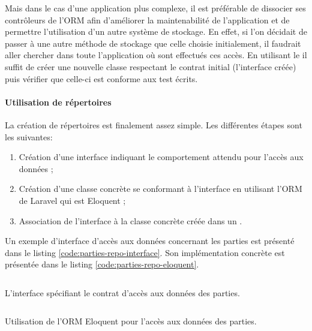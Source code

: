 				Mais dans le cas d'une application plus complexe, il est préférable de dissocier ses contrôleurs de l'ORM afin d'améliorer la maintenabilité de l'application et de permettre l'utilisation d'un autre système de stockage. En effet, si l'on décidait de passer à une autre méthode de stockage que celle choisie initialement, il faudrait aller chercher dans toute l'application où sont effectués ces accès. En utilisant le \repositoryPattern{} il suffit de créer une nouvelle classe respectant le contrat initial (l'interface créée) puis vérifier que celle-ci est conforme aux test écrits.

			\paragraph{Utilisation de répertoires}
				La création de répertoires est finalement assez simple. Les différentes étapes sont les suivantes:
				\begin{enumerate}
					\item Création d'une interface indiquant le comportement attendu pour l'accès aux données ;
					\item Création d'une classe concrète se conformant à l'interface en utilisant l'ORM de Laravel qui est Eloquent ;
					\item Association de l'interface à la classe concrète créée dans un \serviceProvider.
				\end{enumerate}

				Un exemple d'interface d'accès aux données concernant les parties est présenté dans le listing \ref{code:parties-repo-interface}. Son implémentation concrète est présentée dans le listing \ref{code:parties-repo-eloquent}.

				\begin{listing}[H]
					\inputminted[fontsize=\scriptsize]{php}{code/PartiesRepository.php}
					\caption{L'interface spécifiant le contrat d'accès aux données des parties.}
					\label{code:parties-repo-interface}
				\end{listing}

				\begin{code}
					\inputminted[fontsize=\scriptsize]{php}{code/EloquentPartiesRepository.php}
					\caption{Utilisation de l'ORM Eloquent pour l'accès aux données des parties.}
					\label{code:parties-repo-eloquent}
				\end{code}

